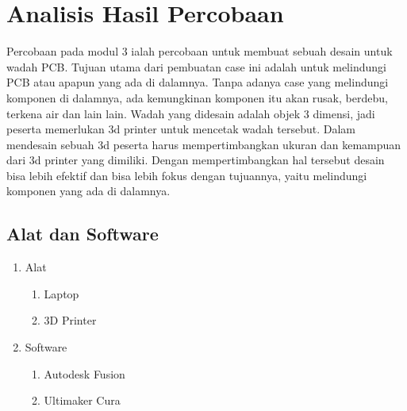     
\section*{Analisis Hasil Percobaan}
\indent
Percobaan pada modul 3 ialah percobaan untuk membuat sebuah desain untuk wadah PCB. Tujuan utama dari pembuatan case ini adalah untuk melindungi PCB atau apapun yang ada di dalamnya. Tanpa adanya case yang melindungi komponen di dalamnya, ada kemungkinan komponen itu akan rusak, berdebu, terkena air dan lain lain. Wadah yang  didesain adalah objek 3 dimensi, jadi peserta memerlukan 3d printer untuk mencetak wadah tersebut. Dalam mendesain sebuah 3d peserta harus mempertimbangkan ukuran dan kemampuan dari 3d printer yang dimiliki. Dengan mempertimbangkan hal tersebut desain bisa lebih efektif dan bisa lebih fokus dengan tujuannya, yaitu melindungi komponen yang ada di dalamnya.

\subsection*{Alat dan Software}
\begin{enumerate}
    \item Alat
        \begin{enumerate}[label*=\arabic*.]
            \item Laptop
            \item 3D Printer
        \end{enumerate}
    \item Software
        \begin{enumerate}[label*=\arabic*.]
            \item Autodesk Fusion
            \item Ultimaker Cura
        \end{enumerate}
    \end{enumerate}

